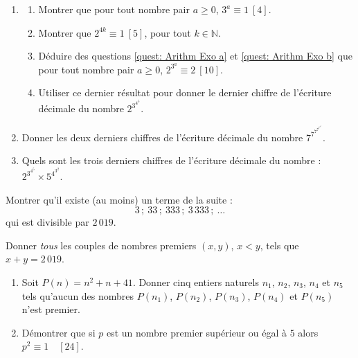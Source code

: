\begin{exo}\label{exo:arith-43}
	\begin{enumerate}
		\item 
			\begin{enumerate}
				\item Montrer que pour tout nombre pair $a \geq 0$, $3^a \equiv 1 \ [4]$.
					\label{quest: Arithm Exo a}
					\item Montrer que $2^{4k} \equiv 1 \ [5]$, pour tout $k \in \mathbb{N}$.
					\label{quest: Arithm Exo b}
				\item D\'eduire des questions \ref{quest: Arithm Exo a} et \ref{quest: Arithm Exo b} que 
					pour tout nombre pair $a \geq 0$, $2^{3^a} \equiv 2 \ [10]$.
				\item Utiliser ce dernier r\'esultat pour donner le dernier chiffre de l'\'ecriture d\'ecimale du nombre
					$2^{3^{4^5}}$.
			\end{enumerate}
		\item Donner les deux derniers chiffres de l'\'ecriture d\'ecimale du nombre $7^{7^{7^{7^{7^{7^7}}}}}$.
		\item Quels sont les trois derniers chiffres de l'\'ecriture d\'ecimale du nombre : 
			$\displaystyle 2^{3^{4^{5}}} \times 5^{4^{3^{2}}}$. \trollface
	\end{enumerate}
\end{exo}

\begin{exo}\label{exo:arith-44}
	Montrer qu'il existe (au moins) un terme de la suite :
		\[
			3			\, ;\ 
			33			\, ;\ 
			333			\, ;\ 
			3\,333		\, ;\ 
			\ldots
		\]
		qui est divisible par $2\,019$.
\end{exo}

\begin{exo}\label{exo:arith-45}
	Donner \emph{tous} les couples de nombres premiers $( x,y )$, $x < y$, tels que $x + y = 2\,019$.
\end{exo}

\begin{exo}\label{exo:arith-46}
	\begin{enumerate}
		\item Soit $P(n) = n^2 + n + 41$.
			Donner cinq entiers naturels $n_1$, $n_2$, $n_3$, $n_4$ et $n_5$ tels 
			qu'aucun des nombres $P(n_1)$, $P(n_2)$, $P(n_3)$, $P(n_4)$ et $P(n_5)$ n'est premier.
			\item D\'emontrer que si $p$ est un nombre premier sup\'erieur ou \'egal \`a $5$ alors $p^2 \equiv 1 \quad [24]$.
	\end{enumerate}
\end{exo}

























